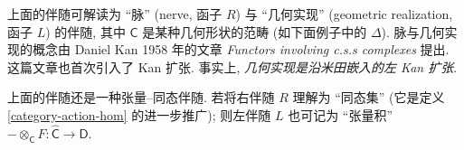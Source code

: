 \begin{remark}
	{}
	上面的伴随可解读为 ``脉'' (nerve, 函子 $R$) 与 ``几何实现'' (geometric realization, 函子 $L$) 的伴随, 其中 $\mathsf C$ 是某种几何形状的范畴 (如下面例子中的 $\Delta$).
	脉与几何实现的概念由 Daniel Kan 1958 年的文章 \emph{Functors involving c.s.s complexes} 提出. 这篇文章也首次引入了 Kan 扩张. 事实上, \emph{几何实现是沿米田嵌入的左 Kan 扩张}.
\end{remark}

\begin{remark}
	{}
	上面的伴随还是一种张量--同态伴随. 若将右伴随 $R$ 理解为 ``同态集'' (它是定义 \ref{category-action-hom} 的进一步推广); 则左伴随 $L$ 也可记为 ``张量积'' ${-}\otimes_{\mathsf C}F\colon \widehat {\mathsf C}\to\mathsf D$.
\end{remark}

